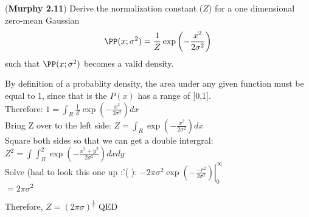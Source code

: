 \documentclass[12pt,letterpaper]{hmcpset}
\begin{document}
\begin{problem}[2]
	(\textbf{Murphy 2.11})
	Derive the normalization constant ($Z$) for a one dimensional
	zero-mean Gaussian
	\[
	\PP(x; \sigma^2) = \frac{1}{Z}\exp\left(-\frac{x^2}{2\sigma^2}\right)
	\]
	such that $\PP(x; \sigma^2)$ becomes a valid density.
\end{problem}
\begin{solution}
By definition of a probablity density, the area under any given function must be equal to 1, since that is the $P(x)$ has a range of [0,1].\\
Therefore: $ 1 = \int_R \frac{1}{Z}\exp\left(-\frac{x^2}{2\sigma^2}\right) dx $\\
Bring Z over to the left side: $Z = \int_R \exp\left(-\frac{x^2}{2\sigma^2}\right) dx $\\
Square both sides so that we can get a double intergral: $Z^2 =\int\int_R^2 \exp(-\frac{x^2 +y^2}{2\sigma^2}) dx dy$ \\
Solve (had to look this one up :'( ): $ \left.-2\pi \sigma^2 \exp(-\frac{-r^2}{2\sigma^2})       \right|_0^\infty $\\
$ = 2\pi \sigma^2 $

Therefore, $ Z = (2\pi \sigma)^\frac{1}{2}$ QED

\end{solution}
\newpage
\end{document}

